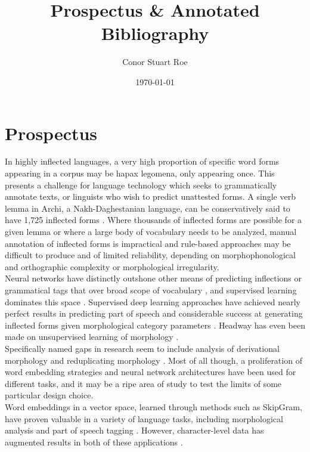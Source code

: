 \documentclass[12pt]{report}
\title{Prospectus \& Annotated Bibliography}
\author{Conor Stuart Roe}
\date{\today}
\begin{document}
\maketitle
\thispagestyle{headings}

\section*{Prospectus}

In highly inflected languages, a very high proportion of specific word forms appearing in a corpus may be hapax legomena, only appearing once. This presents a challenge for language technology which seeks to grammatically annotate texts, or linguists who wish to predict unattested forms. A single verb lemma in Archi, a Nakh-Daghestanian language, can be conservatively said to have 1,725 inflected forms \cite{Cotterell2016}. Where thousands of inflected forms are possible for a given lemma or where a large body of vocabulary needs to be analyzed, manual annotation of inflected forms is impractical and rule-based approaches may be difficult to produce and of limited reliability, depending on morphophonological and orthographic complexity or morphological irregularity. \\

Neural networks have distinctly outshone other means of predicting inflections or grammatical tags that over broad scope of vocabulary \cite{Cotterell2016}, and supervised learning dominates this space \cite{WolfSonkin2018}. Supervised deep learning approaches have achieved nearly perfect results in predicting part of speech \cite{DosSantos2014} and considerable success at generating inflected forms given morphological category parameters \cite{Cotterell2016}. Headway has even been made on unsupervised learning of morphology \cite{WolfSonkin2018}. \\

Specifically named gaps in research seem to include analysis of derivational morphology and reduplicating morphology \cite{Cotterell2016}. Most of all though, a proliferation of word embedding strategies and neural network architectures have been used for different tasks, and it may be a ripe area of study to test the limits of some particular design choice. \\

Word embeddings in a vector space, learned through methods such as SkipGram, have proven valuable in a variety of language tasks, including morphological analysis \cite{Soricut2015} and part of speech tagging \cite{DosSantos2014}. However, character-level data has augmented results in both of these applications \cite{Cotterell2017} \cite{DosSantos2014}. \\
\end{document}
